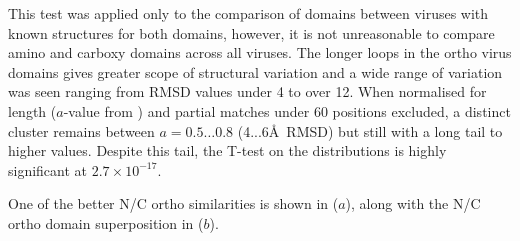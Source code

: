 This test was applied only to the comparison of domains between viruses with 
known structures for both domains, however, it is not unreasonable to compare
amino and carboxy domains across all viruses.  The longer loops in the ortho virus
domains gives greater scope of structural variation and a wide range of variation
was seen ranging from RMSD values under 4 to over 12.  
When normalised for length ($a$-value from ) and partial matches under
60 positions excluded, a distinct cluster remains between $a=0.5\ldots0.8$ (4...6\AA\ 
RMSD) but still with a long tail to higher values.
Despite this tail, the T-test on the distributions is highly significant at $2.7 \times 10^{-17}$.

One of the better N/C ortho similarities is shown in ($a$), along with the
N/C ortho domain superposition in \Fig{final}($b$).
%
%
%
%
%
%
 
